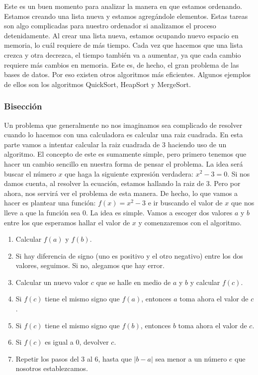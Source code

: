 \documentclass[10pt,letterpaper]{article}
\begin{document}
Este es un buen momento para analizar la manera en que estamos ordenando. Estamos creando una lista nueva y estamos agreg\'andole elementos. Estas tareas son algo complicadas para nuestro ordenador si analizamos el proceso detenidamente. Al crear una lista nueva, estamos ocupando nuevo espacio en memoria, lo cu\'al requiere de m\'as tiempo. Cada vez que hacemos que una lista crezca y otra decrezca, el tiempo tambi\'en va a aumentar, ya que cada cambio requiere m\'as cambios en memoria. Este es, de hecho, el gran problema de las bases de datos. Por eso existen otros algoritmos m\'as eficientes. Algunos ejemplos de ellos son los algoritmos QuickSort, HeapSort y MergeSort.

\subsubsection{Bisecci\'on}
Un problema que generalmente no nos imaginamos sea complicado de resolver cuando lo hacemos con una calculadora es calcular una raiz cuadrada. En esta parte vamos a intentar calcular la raiz cuadrada de 3 haciendo uso de un algoritmo. El concepto de este es sumamente simple, pero primero tenemos que hacer un cambio sencillo en nuestra forma de pensar el problema. La idea ser\'a buscar el n\'umero $x$ que haga la siguiente expresi\'on verdadera: $x^2 - 3 = 0$. Si nos damos cuenta, al resolver la ecuaci\'on, estamos hallando la raiz de 3. Pero por ahora, nos servir\'a ver el problema de esta manera. De hecho, lo que vamos a hacer es plantear una funci\'on: $f \left( x \right) = x^2 - 3$ e ir buscando el valor de $x$ que nos lleve a que la funci\'on sea $0$. La idea es simple. Vamos a escoger dos valores $a$ y $b$ entre los que esperamos hallar el valor de $x$ y comenzaremos con el algoritmo.

\begin{enumerate}
\item Calcular $f \left( a \right)$ y $f \left( b \right)$.
\item Si hay diferencia de signo (uno es positivo y el otro negativo) entre los dos valores, seguimos. Si no, alegamos que hay error.
\item Calcular un nuevo valor $c$ que se halle en medio de $a$ y $b$ y calcular $f \left( c \right)$.
\item Si $f \left( c \right)$ tiene el mismo signo que $f \left( a \right)$, entonces $a$ toma ahora el valor de $c$.
\item Si $f \left( c \right)$ tiene el mismo signo que $f \left( b \right)$, entonces $b$ toma ahora el valor de $c$.
\item Si $f \left( c \right)$ es igual a $0$, devolver $c$.
\item Repetir los pasos del 3 al 6, hasta que $\left| b - a \right|$ sea menor a un n\'umero $e$ que nosotros establezcamos.
\end{enumerate}
\end{document}
